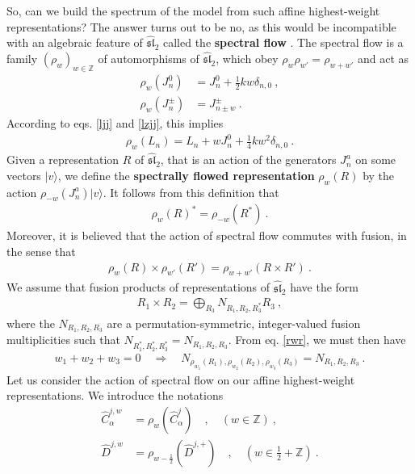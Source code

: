 \documentclass[12pt, a4paper, notitlepage, twoside]{report}
\numberwithin{equation}{section}
\theoremstyle{break}
\begin{document}
So, can we build the spectrum of the model from such affine highest-weight representations?
The answer turns out to be no, as this would be incompatible with an algebraic feature of $\widehat{\mathfrak{sl}}_2$ called the \textbf{\boldmath spectral flow} \cite{mo00a}.
The spectral flow is a family $(\rho_w)_{w\in{\mathbb{Z}}}$ of automorphisms of $\widehat{\mathfrak{sl}}_2$, which obey $\rho_w\rho_{w'}=\rho_{w+w'}$ and act as 
\begin{align}
 \rho_w(J^0_n)&=  J^0_n + \frac12 kw \delta_{n,0}   \ ,
\\
 \rho_w(J^\pm_n) &= J^\pm_{n\pm w}  \ .
\end{align}
According to eqs. \eqref{ljj} and \eqref{lzjj}, this implies
\begin{align}
 \rho_w(L_n)  = L_n + wJ^0_n +\frac14 kw^2 \delta_{n,0}\ .
\end{align}
Given a representation $R$ of $\widehat{\mathfrak{sl}}_2$, that is an action of the generators $J^a_n$ on some vectors $|v\rangle$, we define the \textbf{\boldmath spectrally flowed representation} $\rho_w(R)$ by the action $\rho_{-w}(J^a_n)|v\rangle$.  
It follows from this definition that 
\begin{align}
 \rho_w(R)^* = \rho_{-w}(R^*)\ .
\end{align}
Moreover, it is believed that the action of spectral flow commutes with fusion, in the sense that \cite{gab01b}
\begin{align}
 \rho_{w}(R)\times \rho_{w'}(R') = \rho_{w+w'}(R\times R')\ .
\label{rwr}
\end{align}
We assume that fusion products of representations of $\widehat{\mathfrak{sl}}_2$ have the form 
\begin{align}
 R_1\times R_2 = \bigoplus_{R_3} N_{R_1,R_2,R_3^*} R_3\ ,
\end{align}
where the $N_{R_1,R_2,R_3}$ are a permutation-symmetric, integer-valued fusion multiplicities such that $N_{R_1^*,R_2^*,R_3^*}=N_{R_1,R_2,R_3}$.
From eq. \eqref{rwr}, we must then have 
\begin{align}
w_1+w_2+w_3=0 \quad \Rightarrow \quad N_{\rho_{w_1}(R_1),\rho_{w_2}(R_2),\rho_{w_3}(R_3)}=N_{R_1,R_2,R_3}\ .
\label{nrrr} 
\end{align}
Let us consider the action of spectral flow on our affine highest-weight representations. 
We introduce the notations 
\begin{align}
 \hat{C}^{j,w}_\alpha &= \rho_w(\hat{C}^j_\alpha) \quad , \quad (w\in{\mathbb{Z}})\ ,
\\
\hat{D}^{j,w} &= \rho_{w-\frac12}(\hat{D}^{j,+})\quad , \quad (w\in \tfrac12+{\mathbb{Z}})\ .
\end{align}
\end{document}
